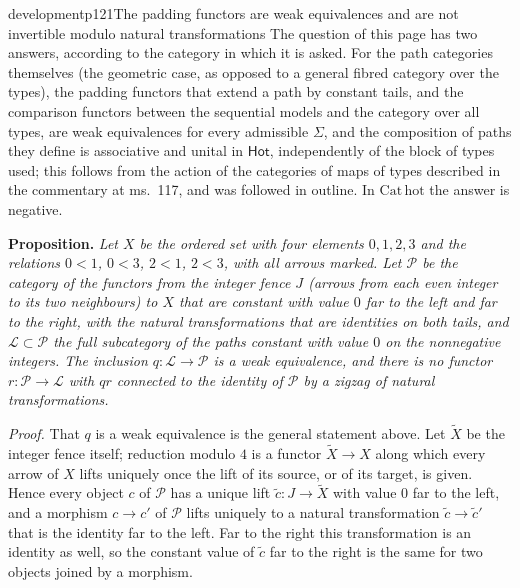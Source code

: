 \begin{dcomment}{development}{p121}{The padding functors are weak equivalences and are not invertible modulo natural transformations}
The question of this page has two answers, according to the category in which it is asked. For the path categories themselves (the geometric case, as opposed to a general fibred category over the types), the padding functors that extend a path by constant tails, and the comparison functors between the sequential models and the category over all types, are weak equivalences for every admissible $\Sigma$, and the composition of paths they define is associative and unital in $\mathsf{Hot}$, independently of the block of types used; this follows from the action of the categories of maps of types described in the commentary at ms.~117, and was followed in outline. In $\mathrm{Cat}\,\mathrm{hot}$ the answer is negative.

\textbf{Proposition.}\ours
\textit{Let $X$ be the ordered set with four elements $0,1,2,3$ and the relations $0<1$, $0<3$, $2<1$, $2<3$, with all arrows marked. Let $\mathcal P$ be the category of the functors from the integer fence $J$ (arrows from each even integer to its two neighbours) to $X$ that are constant with value $0$ far to the left and far to the right, with the natural transformations that are identities on both tails, and $\mathcal L\subset\mathcal P$ the full subcategory of the paths constant with value $0$ on the nonnegative integers. The inclusion $q:\mathcal L\to\mathcal P$ is a weak equivalence, and there is no functor $r:\mathcal P\to\mathcal L$ with $qr$ connected to the identity of $\mathcal P$ by a zigzag of natural transformations.}

\textit{Proof.}
That $q$ is a weak equivalence is the general statement above. Let $\widetilde X$ be the integer fence itself; reduction modulo $4$ is a functor $\widetilde X\to X$ along which every arrow of $X$ lifts uniquely once the lift of its source, or of its target, is given. Hence every object $c$ of $\mathcal P$ has a unique lift $\widetilde c:J\to\widetilde X$ with value $0$ far to the left, and a morphism $c\to c'$ of $\mathcal P$ lifts uniquely to a natural transformation $\widetilde c\to\widetilde c'$ that is the identity far to the left. Far to the right this transformation is an identity as well, so the constant value of $\widetilde c$ far to the right is the same for two objects joined by a morphism.


\end{dcomment}
